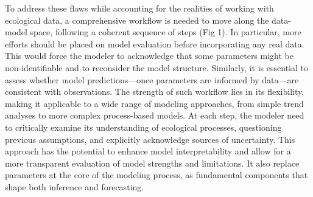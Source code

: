 \documentclass[11pt]{article}
\begin{document}
To address these flaws while accounting for the realities of working with ecological data, a comprehensive workflow is needed to move along the data-model space, following a coherent sequence of steps (Fig 1). In particular, more efforts should be placed on model evaluation before incorporating any real data. This would force the modeler to acknowledge that some parameters might be non-identifiable and to reconsider the model structure. Similarly, it is essential to assess whether model predictions---once parameters are informed by data---are consistent with observations. The strength of such workflow lies in its flexibility, making it applicable to a wide range of modeling approaches, from simple trend analyses to more complex process-based models. At each step, the modeler need to critically examine its understanding of ecological processes, questioning previous assumptions, and explicitly acknowledge sources of uncertainty. This approach has the potential to enhance model interpretability and allow for a more transparent evaluation of model strengths and limitations. It also replace parameters at the core of the modeling process, as fundamental components that shape both inference and forecasting. %
\end{document}
